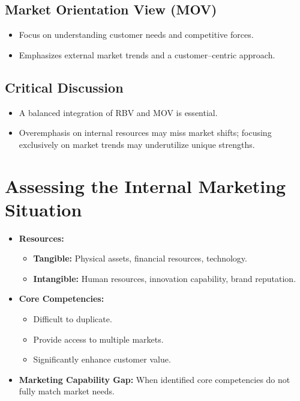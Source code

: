 \documentclass[12pt,a4paper]{report}
\begin{document}
\subsection{Market Orientation View (MOV)}
\begin{itemize}
    \item Focus on understanding customer needs and competitive forces.
    \item Emphasizes external market trends and a customer--centric approach.
\end{itemize}

\subsection{Critical Discussion}
\begin{itemize}
    \item A balanced integration of RBV and MOV is essential.
    \item Overemphasis on internal resources may miss market shifts; focusing exclusively on market trends may underutilize unique strengths.
\end{itemize}

\section{Assessing the Internal Marketing Situation}
\begin{itemize}
    \item \textbf{Resources:}
    \begin{itemize}
         \item \textbf{Tangible:} Physical assets, financial resources, technology.
         \item \textbf{Intangible:} Human resources, innovation capability, brand reputation.
    \end{itemize}
    \item \textbf{Core Competencies:} 
         \begin{itemize}
             \item Difficult to duplicate.
             \item Provide access to multiple markets.
             \item Significantly enhance customer value.
         \end{itemize}
    \item \textbf{Marketing Capability Gap:} When identified core competencies do not fully match market needs.
\end{itemize}
\end{document}
